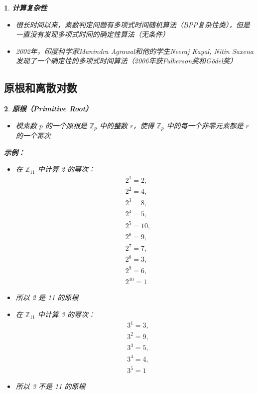 \documentclass[UTF8]{report}
\theoremstyle{MyLineTheoremStyle} %
\theoremstyle{MyBlockTheoremStyle} %
\theoremstyle{MySubsubsectionStyle} %
\newtheorem{definition}{}
\begin{document}
\begin{definition}
    \textbf{计算复杂性}
    \begin{itemize}
        \item 很长时间以来，素数判定问题有多项式时间随机算法（BPP复杂性类），但是一直没有发现多项式时间的确定性算法（无条件）
        \item 2002年，印度科学家Manindra Agrawal和他的学生Neeraj Kayal, Nitin Saxena发现了一个确定性的多项式时间算法（2006年获Fulkerson奖和Gödel奖）
    \end{itemize}
\end{definition}

\subsection{原根和离散对数}

\begin{definition}
    \textbf{原根（Primitive Root）}
    \begin{itemize}
        \item 模素数 $p$ 的一个原根是 $\mathbb{Z}_p$ 中的整数 $r$，使得 $\mathbb{Z}_p$ 中的每一个非零元素都是 $r$ 的一个幂次
    \end{itemize}

    \textbf{示例：}
    \begin{itemize}
        \item 在 $\mathbb{Z}_{11}$ 中计算 2 的幂次：
        \[
        \begin{aligned}
            &2^1 = 2, \\
            &2^2 = 4, \\
            &2^3 = 8, \\
            &2^4 = 5, \\
            &2^5 = 10, \\
            &2^6 = 9, \\
            &2^7 = 7, \\
            &2^8 = 3, \\
            &2^9 = 6, \\
            &2^{10} = 1
        \end{aligned}
        \]
        \item 所以 2 是 11 的原根
        \item 在 $\mathbb{Z}_{11}$ 中计算 3 的幂次：
        \[
        \begin{aligned}
            &3^1 = 3, \\
            &3^2 = 9, \\
            &3^3 = 5, \\
            &3^4 = 4, \\
            &3^5 = 1
        \end{aligned}
        \]
        \item 所以 3 不是 11 的原根
    \end{itemize}


\end{definition}
\end{document}
